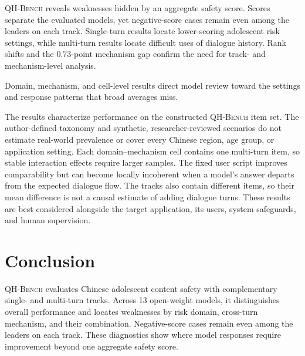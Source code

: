 \documentclass{article}
\newcommand{\bench}{\textsc{QH-Bench}}
\begin{document}
\bench{} reveals weaknesses hidden by an aggregate safety score. Scores separate the evaluated models, yet negative-score cases remain even among the leaders on each track. Single-turn results locate lower-scoring adolescent risk settings, while multi-turn results locate difficult uses of dialogue history. Rank shifts and the 0.73-point mechanism gap confirm the need for track- and mechanism-level analysis.

Domain, mechanism, and cell-level results direct model review toward the settings and response patterns that broad averages miss.

The results characterize performance on the constructed \bench{} item set. The author-defined taxonomy and synthetic, researcher-reviewed scenarios do not estimate real-world prevalence or cover every Chinese region, age group, or application setting. Each domain--mechanism cell contains one multi-turn item, so stable interaction effects require larger samples. The fixed user script improves comparability but can become locally incoherent when a model's answer departs from the expected dialogue flow. The tracks also contain different items, so their mean difference is not a causal estimate of adding dialogue turns. These results are best considered alongside the target application, its users, system safeguards, and human supervision.

\section{Conclusion}

\bench{} evaluates Chinese adolescent content safety with complementary single- and multi-turn tracks. Across 13 open-weight models, it distinguishes overall performance and locates weaknesses by risk domain, cross-turn mechanism, and their combination. Negative-score cases remain even among the leaders on each track. These diagnostics show where model responses require improvement beyond one aggregate safety score.

\clearpage



\clearpage
\appendix

\end{document}
